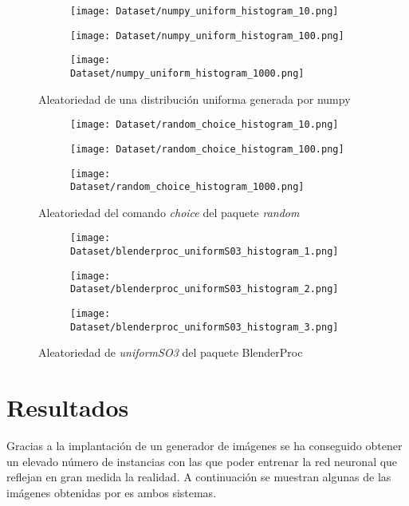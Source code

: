 \begin{figure}[ht]
	\ContinuedFloat
	\centering
	\begin{subfigure}[b]{0.3\linewidth}
		\texttt{[image: Dataset/numpy\_uniform\_histogram\_10.png]}
	\end{subfigure}
	\begin{subfigure}[b]{0.3\linewidth}
		\texttt{[image: Dataset/numpy\_uniform\_histogram\_100.png]}
	\end{subfigure}
	\begin{subfigure}[b]{0.3\linewidth}
		\texttt{[image: Dataset/numpy\_uniform\_histogram\_1000.png]}
	\end{subfigure}
	\caption{Aleatoriedad de una distribución uniforma generada por numpy}
	\label{chap:Generación de un dataset fig:numpy uniform}
	
	\begin{subfigure}[b]{0.3\linewidth}
		\texttt{[image: Dataset/random\_choice\_histogram\_10.png]}
	\end{subfigure}
	\begin{subfigure}[b]{0.3\linewidth}
		\texttt{[image: Dataset/random\_choice\_histogram\_100.png]}
	\end{subfigure}
	\begin{subfigure}[b]{0.3\linewidth}
		\texttt{[image: Dataset/random\_choice\_histogram\_1000.png]}
	\end{subfigure}
	\caption{Aleatoriedad del comando \textit{choice} del paquete \textit{random}}
	\label{chap:Generación de un dataset fig:random choice}
	
	\begin{subfigure}[b]{0.3\linewidth}
		\texttt{[image: Dataset/blenderproc\_uniformS03\_histogram\_1.png]}
	\end{subfigure}
	\begin{subfigure}[b]{0.3\linewidth}
		\texttt{[image: Dataset/blenderproc\_uniformS03\_histogram\_2.png]}
	\end{subfigure}
	\begin{subfigure}[b]{0.3\linewidth}
		\texttt{[image: Dataset/blenderproc\_uniformS03\_histogram\_3.png]}
	\end{subfigure}
	\caption{Aleatoriedad de \textit{uniformSO3} del paquete BlenderProc}
	\label{chap:Generación de un dataset fig:uniformS03}
\end{figure}

\section{Resultados}
\label{chap:Generación de un dataset sec:Resultados}
Gracias a la implantación de un generador de imágenes se ha conseguido obtener un elevado número de instancias con las que poder entrenar la red neuronal que reflejan en gran medida la realidad. A continuación se muestran algunas de las imágenes obtenidas por es ambos sistemas.

